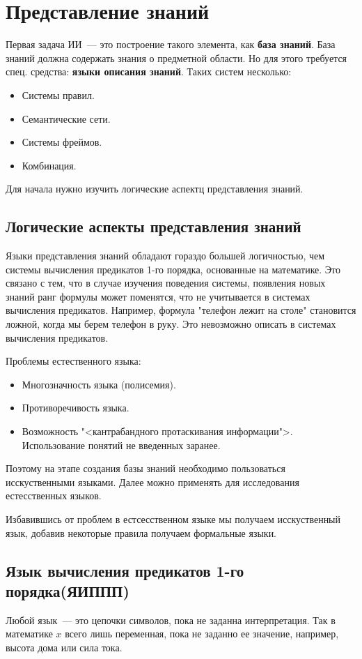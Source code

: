 \section{Представление знаний}
Первая задача ИИ~--- это построение такого элемента, как \textbf{база знаний}. База знаний должна содержать знания о предметной области. Но для этого требуется спец. средства: \textbf{языки описания знаний}. Таких систем несколько:
\begin{itemize}
	\item Системы правил.
	\item Семантические сети.
	\item Системы фреймов.
	\item Комбинация.
\end{itemize}

Для начала нужно изучить логические аспектц представления знаний.
\subsection{Логические аспекты представления знаний}
Языки представления знаний обладают гораздо большей логичностью, чем системы вычисления предикатов 1-го порядка, основанные на математике. Это связано с тем, что в случае изучения поведения системы, появления новых знаний ранг формулы может поменятся, что не учитывается в системах вычисления предикатов. Например, формула "телефон лежит на столе" становится ложной, когда мы берем телефон в руку. Это невозможно описать в системах вычисления предикатов.

Проблемы естественного языка:
\begin{itemize}
	\item Многозначность языка (полисемия).
	\item Противоречивость языка.
	\item Возможность "<кантрабандного протаскивания информации">. Использование понятий не введенных заранее.
\end{itemize}

Поэтому на этапе создания базы знаний необходимо пользоваться исскуственными языками. Далее можно применять для исследования естесственных языков.

Избавившись от проблем в естсесственном языке мы получаем исскуственный язык, добавив некоторые правила получаем формальные языки.

\subsection{Язык вычисления предикатов 1-го порядка(ЯИППП)}
Любой язык~--- это цепочки символов, пока не заданна интерпретация. Так в математике $x$ всего лишь переменная, пока не заданно ее значение, например, высота дома или сила тока.

